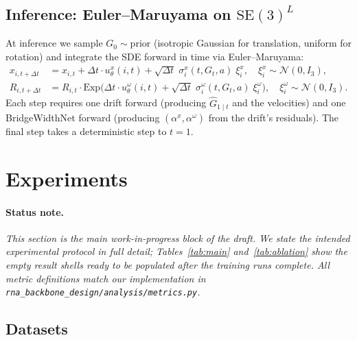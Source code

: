 \documentclass{article}
\theoremstyle{remark}
\theoremstyle{definition}
\newcommand{\SE}{\mathrm{SE}}
\newcommand{\Exp}{\mathrm{Exp}}
\begin{document}
\subsection{Inference: Euler--Maruyama on $\SE(3)^L$}
\label{subsec:inference}

At inference we sample $G_0\sim\mathrm{prior}$ (isotropic Gaussian for
translation, uniform for rotation) and integrate the SDE forward in time via
Euler--Maruyama:
\begin{align}
x_{i,t+\Delta t} &= x_{i,t}+\Delta t\cdot u^x_\theta(i,t)
   +\sqrt{\Delta t}\;\sigma^x_i(t,G_t,a)\;\xi^x_i,
   \quad \xi^x_i\sim\mathcal{N}(0,I_3),\\
R_{i,t+\Delta t} &= R_{i,t}\cdot\Exp\!\Big(
   \Delta t\cdot u^\omega_\theta(i,t)
   +\sqrt{\Delta t}\;\sigma^\omega_i(t,G_t,a)\;\xi^\omega_i\Big),
   \quad \xi^\omega_i\sim\mathcal{N}(0,I_3).
\end{align}
Each step requires one drift forward (producing $\hat{G}_{1\mid t}$ and the
velocities) and one BridgeWidthNet forward (producing $(\alpha^x,\alpha^\omega)$
from the drift's residuals). The final step takes a deterministic step to
$t=1$.

\section{Experiments}
\label{sec:experiments}

\paragraph{Status note.}
\emph{This section is the main work-in-progress block of the draft. We state
the intended experimental protocol in full detail; Tables~\ref{tab:main}
and~\ref{tab:ablation} show the empty result shells ready to be populated
after the training runs complete. All metric definitions match our
implementation in \texttt{rna\_backbone\_design/analysis/metrics.py}.}

\subsection{Datasets}
\label{subsec:exp-data}
\end{document}
